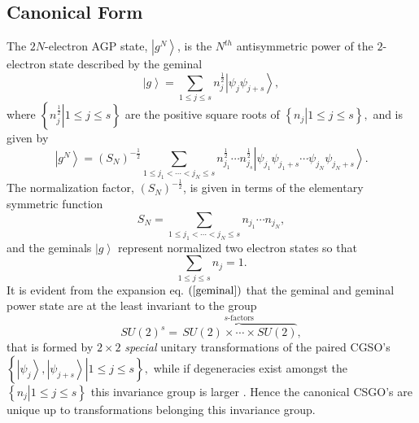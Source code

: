 \documentclass[aps,preprint]{revtex4}%
\begin{document}
\subsection{Canonical Form}

The $2N$-electron AGP state, $\left\vert g^{N}\right\rangle $, is the $N^{th}$
antisymmetric power of the $2$-electron state described by the geminal
\begin{equation}
\left\vert g\right\rangle =\sum_{1\leq j\leq s}n_{j}^{\frac{1}{2}}\left\vert
\psi_{j}\psi_{j+s}\right\rangle , \label{geminal}%
\end{equation}
where $\left\{  \left.  n_{j}^{\frac{1}{2}}\right\vert 1\leq j\leq s\right\}
$ are the positive square roots of $\left\{  \left.  n_{j}\right\vert 1\leq
j\leq s\right\}  ,$ and is given by \cite{weiner&ortiz2004}
\begin{equation}
\left\vert g^{N}\right\rangle =\left(  S_{N}\right)  ^{-\frac{1}{2}}%
\sum_{1\leq j_{1}<\cdots<j_{N}\leq s}n_{j_{1}}^{\frac{1}{2}}\cdots n_{j_{s}%
}^{\frac{1}{2}}\left\vert \psi_{j_{1}}\psi_{j_{1}+s}\cdots\psi_{j_{N}}%
\psi_{j_{N}+s}\right\rangle . \label{agp}%
\end{equation}
The normalization factor, $\left(  S_{N}\right)  ^{-\frac{1}{2}}$, is given in
terms of the elementary symmetric function
\begin{equation}
S_{N}=\sum_{1\leq j_{1}<\cdots<j_{N}\leq s}n_{j_{1}}\cdots n_{j_{N}},
\end{equation}
and the geminals $\left\vert g\right\rangle $ represent normalized two
electron states so that
\begin{equation}
\sum_{1\leq j\leq s}n_{j}=1.
\end{equation}
It is evident from the expansion eq. $\left(  \ref{geminal}\right)  $ that the
geminal and geminal power state are at the least invariant to the group
\begin{equation}
SU\left(  2\right)  ^{s}=\overset{s\text{-factors}}{\overbrace{\,SU\left(
2\right)  \times\cdots\times SU\left(  2\right)  }},
\end{equation}
that is formed by $2\times2$ \emph{special} unitary transformations of the
paired CGSO's $\left\{  \left.  \left\vert \psi_{j}\right\rangle ,\left\vert
\psi_{j+s}\right\rangle \right\vert 1\leq j\leq s\right\}  ,$ while if
degeneracies exist amongst the $\left\{  \left.  n_{j}\right\vert 1\leq j\leq
s\right\}  $ this invariance group is larger \cite{Weiner2004}. Hence the
canonical CSGO's are unique up to transformations belonging this invariance group.
\end{document}
